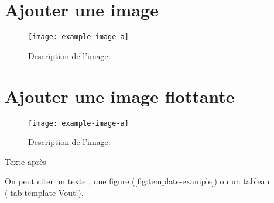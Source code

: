 \section{Ajouter une image}

\begin{figure}[h!]
    \centering
    \texttt{[image: example-image-a]}
    \caption{Description de l'image.}
    \label{fig:template-example-image}
\end{figure}

\section{Ajouter une image flottante}

\begin{wrapfigure}{r}{0.25\linewidth}
    \centering
    \texttt{[image: example-image-a]}
    \caption{Description de l'image.}
    \label{fig:template-example-flottante}
\end{wrapfigure}

Texte après

On peut citer
un texte \cite{boutin_en_2009},
une figure (\ref{fig:template-example}) ou
un tableau (\ref{tab:template-Vout}).